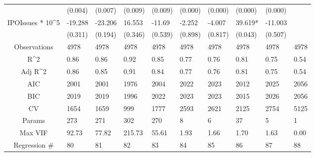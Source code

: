 \documentclass{article}
\begin{document}
\begin{table}[H]
\begin{tabular}{|clllllllll|}
   & (0.004) & (0.007) & (0.009) & (0.009) & (0.000) & (0.000) & (0.000) & (0.000) &  \\ 
  IPOIssues * 10^5 & -19.288 & -23.206 & 16.553 & -11.69 & -2.252 & -4.007 & 39.619* & -11.003 &  \\ 
   & (0.311) & (0.194) & (0.346) & (0.539) & (0.898) & (0.817) & (0.043) & (0.507) &  \\ 
  \hline 
 Observations & 4978 & 4978 & 4978 & 4978 & 4978 & 4978 & 4978 & 4978 & 4978 \\ 
  R^2 & 0.86 & 0.86 & 0.92 & 0.85 & 0.77 & 0.76 & 0.81 & 0.75 & 0.54 \\ 
  Adj R^2 & 0.86 & 0.85 & 0.91 & 0.84 & 0.77 & 0.76 & 0.81 & 0.75 & 0.54 \\ 
  AIC & 2001 & 2001 & 1976 & 2004 & 2022 & 2023 & 2012 & 2025 & 2056 \\ 
  BIC & 2019 & 2019 & 1996 & 2022 & 2023 & 2023 & 2015 & 2026 & 2056 \\ 
  CV & 1654 & 1659 & 999 & 1777 & 2593 & 2621 & 2125 & 2754 & 5125 \\ 
  Params & 273 & 271 & 302 & 270 & 8 & 6 & 37 & 5 & 1 \\ 
  Max VIF & 92.73 & 77.82 & 215.73 & 55.61 & 1.93 & 1.66 & 1.70 & 1.63 & 0.00 \\ 
  Regression \# & 80 & 81 & 82 & 83 & 84 & 85 & 86 & 87 & 88 \\ 
   \hline
\end{tabular}
 
\end{table}
\end{document}

